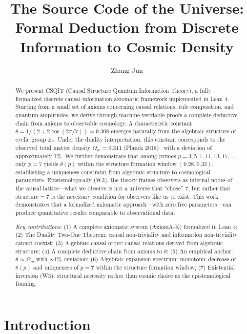 \documentclass[aps,prd,twocolumn,nofootinbib,floatfix]{revtex4-2}
\title{The Source Code of the Universe: Formal Deduction from Discrete Information to Cosmic Density}
\author{Zhang Jun}
\affiliation{New Beginning Universe Research Group (Independent Researcher)}
\begin{document}
\maketitle

\begin{abstract}
We present CSQIT (Causal Structure Quantum Information Theory), a fully formalized discrete causal-information axiomatic framework implemented in Lean 4. Starting from a small set of axioms concerning causal relations, rule composition, and quantum amplitudes, we derive through machine-verifiable proofs a complete deductive chain from axioms to observable cosmology. A characteristic constant $\theta = 1/(2+2\cos(2\pi/7)) \approx 0.308$ emerges naturally from the algebraic structure of cyclic group $\mathbb{Z}_7$. Under the duality interpretation, this constant corresponds to the observed total matter density $\Omega_m = 0.311$ (Planck 2018)~\cite{Planck2018} with a deviation of approximately 1\%. We further demonstrate that among primes $p=3,5,7,11,13,17,\ldots$, only $p=7$ yields $\theta(p)$ within the structure formation window $(0.28, 0.33)$, establishing a uniqueness constraint from algebraic structure to cosmological parameters. Epistemologically (W3), the theory frames observers as internal nodes of the causal lattice---what we observe is not a universe that ``chose'' 7, but rather that structure$=7$ is the necessary condition for observers like us to exist. This work demonstrates that a formalized axiomatic approach---with zero free parameters---can produce quantitative results comparable to observational data.

\textit{Key contributions}: (1) A complete axiomatic system (AxiomA-K) formalized in Lean 4; (2) The Duality Two-One Theorem: causal non-triviality and information non-triviality cannot coexist; (3) Algebraic causal order: causal relations derived from algebraic structure; (4) A complete deductive chain from axioms to $\theta$; (5) An empirical anchor: $\theta \approx \Omega_m$ with $\sim 1\%$ deviation; (6) Algebraic expansion spectrum: monotonic decrease of $\theta(p)$ and uniqueness of $p=7$ within the structure formation window; (7) Existential inversion (W3): structural necessity rather than cosmic choice as the epistemological framing.
\end{abstract}


\section{Introduction}
\end{document}
